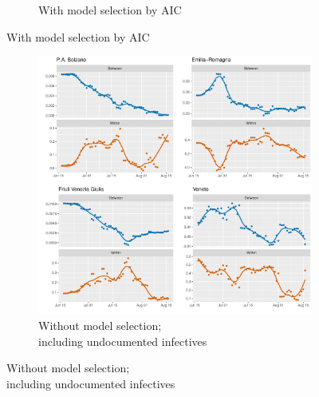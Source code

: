 \documentclass[12pt]{article}
\begin{document}
\begin{appendices}
\begin{figure}[H]
\begin{subfigure}{\textwidth}
    	      \caption{With model selection by AIC}
    	      \label{fig:beta_between_over_time_nordest_aic}
    	    \end{subfigure}
    	\end{figure}
        \begin{figure}[H]\ContinuedFloat
    	    \begin{subfigure}{\textwidth}
    	      \centering
    	      \includegraphics[width=\linewidth]{output/model_between_lag14_betas_Nord-Est_UndocQuadratic_rolling.pdf}
    	      \caption{Without model selection; \\ including undocumented infectives}
    	      \label{fig:beta_between_over_time_nordest_regular_undoc}
    	    \end{subfigure}
        \end{figure}
        \begin{figure}[H]\ContinuedFloat
    	    \begin{subfigure}{\textwidth}
    	      \centering

\end{subfigure}
\end{figure}
\end{appendices}
\end{document}

